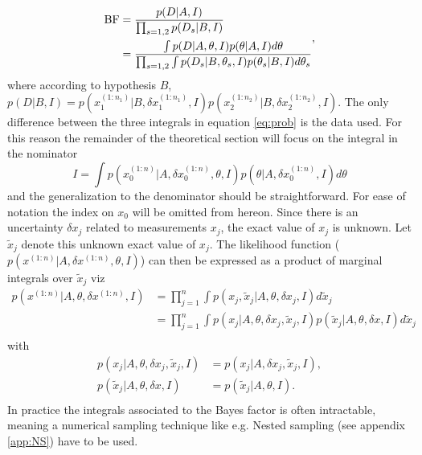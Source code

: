 \begin{equation}
	\begin{split}
		\rm BF &= \frac{p(D|A,I)}{\prod_{s=1,2}p(D_s|B,I)}\\
		&=\frac{\int p(D|A,\theta,I) p(\theta|A,I) d\theta}{\prod_{s=1,2}\int p(D_s|B,\theta_s,I) p(\theta_s|B,I)d\theta_s}
	\end{split},
	\label{eq:prob}
\end{equation}
where according to hypothesis $B$, $p(D|B,I) =p(x_1^{(1:n_1)}|B,\delta x_1^{(1:n_1)},I)p(x_2^{(1:n_2)}|B,\delta x_2^{(1:n_2)},I)$. The only difference between the three integrals in equation \eqref{eq:prob} is the data used. For this reason the remainder of the theoretical section will focus on the integral in the nominator
\begin{equation}
	I = \int p(x_0^{(1:n)}|A,\delta x_0^{(1:n)},\theta,I) p(\theta|A,\delta x_0^{(1:n)},I) d\theta
\end{equation}
and the generalization to the denominator should be straightforward. For ease of notation the index on $x_0$ will be omitted from hereon. Since there is an uncertainty $\delta x_j$ related to measurements $x_j$, the exact value of $x_j$ is unknown. Let $\tilde{x}_j$ denote this unknown exact value of $x_j$. The likelihood function ($p(x^{(1:n)}|A,\delta x^{(1:n)},\theta,I)$) can then be expressed as a product of marginal integrals over $\tilde{x}_j$ viz
\begin{equation}
	\begin{split}
		p(x^{(1:n)}|A,\theta,\delta x^{(1:n)}, I) &= \prod_{j=1}^{n}\int p(x_j,\tilde{x}_j|A,\theta,\delta x_j, I)d \tilde{x}_j\\
		&= \prod_{j=1}^{n}\int p(x_j|A,\theta,\delta x_j, \tilde{x}_j, I)p(\tilde{x}_j|A,\theta,\delta x, I)d \tilde{x}_j\\
	\end{split}
\end{equation}
with
\begin{equation}
	\begin{split}
		p(x_j|A,\theta,\delta x_j, \tilde{x}_j, I)
		& = p(x_j|A,\delta x_j, \tilde{x}_j, I),\\
		p(\tilde{x}_j|A,\theta,\delta x, I)
		&=p(\tilde{x}_j|A,\theta, I).\\
	\end{split}
\end{equation}
In practice the integrals associated to the Bayes factor is often intractable, meaning a numerical sampling technique like e.g. Nested sampling (see appendix \ref{app:NS}) have to be used.

